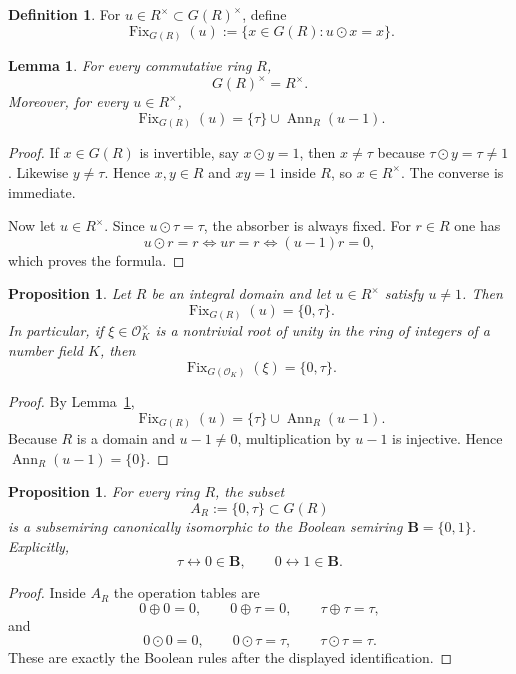 \documentclass[11pt,a4paper]{article}
\numberwithin{equation}{section}
\newtheorem{proposition}[theorem]{Proposition}
\newtheorem{lemma}[theorem]{Lemma}
\theoremstyle{definition}
\newtheorem{definition}[theorem]{Definition}
\theoremstyle{remark}
\DeclareMathOperator{\Fix}{Fix}
\DeclareMathOperator{\Ann}{Ann}
\newcommand{\BB}{\mathbf B}
\newcommand{\cO}{\mathcal O}
\newcommand{\taup}{\tau}
\begin{document}
\begin{definition}
For $u\in R^\times\subset G(R)^\times$, define
\[
\Fix_{G(R)}(u):=\{x\in G(R):u\odot x=x\}.
\]
\end{definition}

\begin{lemma}\label{P1:lem:units-fix}
For every commutative ring $R$,
\[
G(R)^\times=R^\times.
\]
Moreover, for every $u\in R^\times$,
\[
\Fix_{G(R)}(u)=\{\taup\}\cup\Ann_R(u-1).
\]
\end{lemma}

\begin{proof}
If $x\in G(R)$ is invertible, say $x\odot y=1$, then $x\neq\taup$ because $\taup\odot y=\taup\neq1$.  Likewise $y\neq\taup$.  Hence $x,y\in R$ and $xy=1$ inside $R$, so $x\in R^\times$.  The converse is immediate.

Now let $u\in R^\times$.  Since $u\odot\taup=\taup$, the absorber is always fixed.  For $r\in R$ one has
\[
u\odot r=r \iff ur=r \iff (u-1)r=0,
\]
which proves the formula.
\end{proof}

\begin{proposition}\label{P1:prop:split-root-domain}
Let $R$ be an integral domain and let $u\in R^\times$ satisfy $u\neq1$.  Then
\[
\Fix_{G(R)}(u)=\{0,\taup\}.
\]
In particular, if $\xi\in\cO_K^\times$ is a nontrivial root of unity in the ring of integers of a number field $K$, then
\[
\Fix_{G(\cO_K)}(\xi)=\{0,\taup\}.
\]
\end{proposition}

\begin{proof}
By Lemma~\ref{P1:lem:units-fix},
\[
\Fix_{G(R)}(u)=\{\taup\}\cup\Ann_R(u-1).
\]
Because $R$ is a domain and $u-1\neq0$, multiplication by $u-1$ is injective.  Hence $\Ann_R(u-1)=\{0\}$.
\end{proof}

\begin{proposition}\label{P1:prop:boolean-pair}
For every ring $R$, the subset
\[
A_R:=\{0,\taup\}\subset G(R)
\]
is a subsemiring canonically isomorphic to the Boolean semiring $\BB=\{0,1\}$.  Explicitly,
\[
\taup\longleftrightarrow 0\in\BB,
\qquad
0\longleftrightarrow 1\in\BB.
\]
\end{proposition}

\begin{proof}
Inside $A_R$ the operation tables are
\[
0\oplus0=0,\qquad 0\oplus\taup=0,\qquad \taup\oplus\taup=\taup,
\]
and
\[
0\odot0=0,\qquad 0\odot\taup=\taup,\qquad \taup\odot\taup=\taup.
\]
These are exactly the Boolean rules after the displayed identification.
\end{proof}
\end{document}
